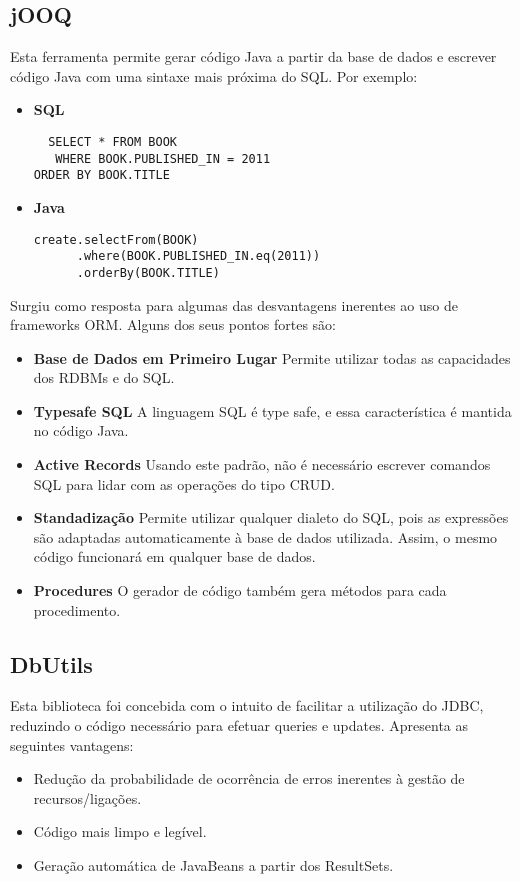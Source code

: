 \documentclass{article}
\begin{document}
\subsection{jOOQ}
Esta ferramenta permite gerar código Java a partir da base de dados e escrever código Java com uma sintaxe mais próxima do SQL. Por exemplo:\par
\begin{itemize}
\item \textbf{SQL}
\begin{verbatim}
  SELECT * FROM BOOK
   WHERE BOOK.PUBLISHED_IN = 2011
ORDER BY BOOK.TITLE
\end{verbatim}
\item \textbf{Java}
\begin{verbatim}
create.selectFrom(BOOK)
      .where(BOOK.PUBLISHED_IN.eq(2011))
      .orderBy(BOOK.TITLE)
\end{verbatim}
\end{itemize}
Surgiu como resposta para algumas das desvantagens inerentes ao uso de frameworks ORM. Alguns dos seus pontos fortes são:
\begin{itemize}
\item \textbf{Base de Dados em Primeiro Lugar} Permite utilizar todas as capacidades dos RDBMs e do SQL.
\item \textbf{Typesafe SQL} A linguagem SQL é type safe, e essa característica é mantida no código Java.
\item \textbf{Active Records} Usando este padrão, não é necessário escrever comandos SQL para lidar com as operações do tipo CRUD.
\item \textbf{Standadização} Permite utilizar qualquer dialeto do SQL, pois as expressões são adaptadas automaticamente à base de dados utilizada. Assim, o mesmo código funcionará em qualquer base de dados.
\item \textbf{Procedures} O gerador de código também gera métodos para cada procedimento.
\end{itemize}

\subsection{DbUtils}
Esta biblioteca	foi concebida com o intuito de facilitar a utilização do JDBC, reduzindo o código necessário para efetuar queries e updates. Apresenta as seguintes vantagens:
\begin{itemize}
\item Redução da probabilidade de ocorrência de erros inerentes à gestão de recursos/ligações.
\item Código mais limpo e legível.
\item Geração automática de JavaBeans a partir dos ResultSets.
\end{itemize}
\end{document}
